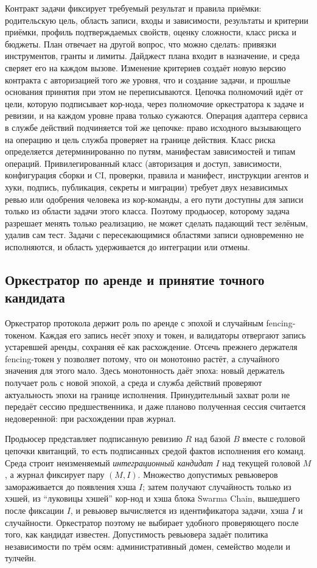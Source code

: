 \documentclass[10pt,a4paper]{article}
\begin{document}
Контракт задачи фиксирует требуемый результат и правила приёмки: родительскую цель, область записи, входы и зависимости, результаты и критерии приёмки, профиль подтверждаемых свойств, оценку сложности, класс риска и бюджеты. План отвечает на другой вопрос, что можно сделать: привязки инструментов, гранты и лимиты. Дайджест плана входит в назначение, и среда сверяет его на каждом вызове. Изменение критериев создаёт новую версию контракта с авторизацией того же уровня, что и создание задачи, и прошлые основания принятия при этом не переписываются. Цепочка полномочий идёт от цели, которую подписывает кор-нода, через полномочие оркестратора к задаче и ревизии, и на каждом уровне права только сужаются. Операция адаптера сервиса в службе действий подчиняется той же цепочке: право исходного вызывающего на операцию и цель служба проверяет на границе действия. Класс риска определяется детерминированно по путям, манифестам зависимостей и типам операций. Привилегированный класс (авторизация и доступ, зависимости, конфигурация сборки и CI, проверки, правила и манифест, инструкции агентов и хуки, подпись, публикация, секреты и миграции) требует двух независимых ревью или одобрения человека из кор-команды, а его пути доступны для записи только из области задачи этого класса. Поэтому продьюсер, которому задача разрешает менять только реализацию, не может сделать падающий тест зелёным, удалив сам тест. Задачи с пересекающимися областями записи одновременно не исполняются, и область удерживается до интеграции или отмены.

\subsection{Оркестратор по аренде и принятие точного кандидата}
\label{sec:accept}

Оркестратор протокола держит роль по аренде \cite{chubby} с эпохой и случайным fencing-токеном. Каждая его запись несёт эпоху и токен, и валидаторы отвергают запись устаревшей аренды, сохраняя её как расхождение. Отсечь прежнего держателя fencing-токен у \cite{kleppmann-fencing} позволяет потому, что он монотонно растёт, а случайного значения для этого мало. Здесь монотонность даёт эпоха: новый держатель получает роль с новой эпохой, а среда и служба действий проверяют актуальность эпохи на границе исполнения. Принудительный захват роли не передаёт сессию предшественника, и даже планово полученная сессия считается недоверенной: при расхождении прав журнал.

Продьюсер представляет подписанную ревизию $R$ над базой $B$ вместе с головой цепочки квитанций, то есть подписанных средой фактов исполнения его команд. Среда строит неизменяемый \emph{интеграционный кандидат} $I$ над текущей головой $M$, а журнал фиксирует пару $(M,I)$. Множество допустимых ревьюверов замораживается до появления хэша $I$; затем получают случайность только из хэшей, из ``луковицы хэшей'' кор-нод и хэша блока Swarma Chain, вышедшего после фиксации $I$, и ревьювер вычисляется из идентификатора задачи, хэша $I$ и случайности. Оркестратор поэтому не выбирает удобного проверяющего после того, как кандидат известен. Допустимость ревьювера задаёт политика независимости по трём осям: административный домен, семейство модели и тулчейн.
\end{document}
